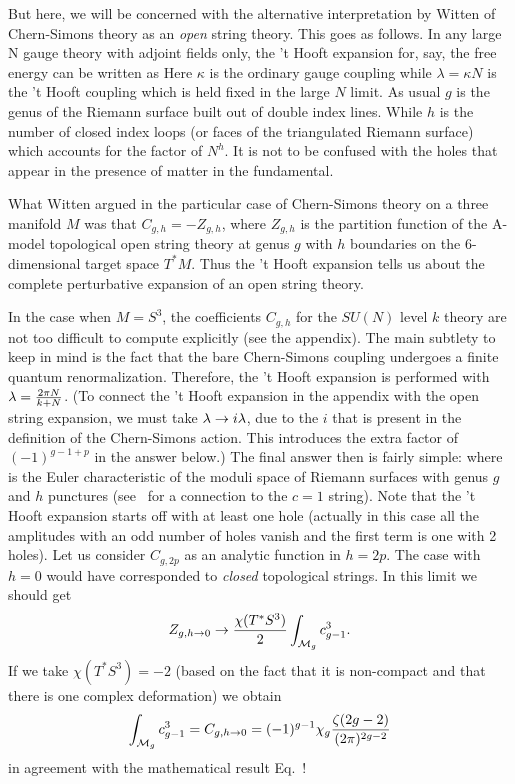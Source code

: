 But here, we will be concerned with the alternative interpretation
by Witten of Chern-Simons theory as an {\it open} string theory. This goes
as follows. In any large N gauge theory with adjoint fields only, the
't Hooft expansion for, say, the free energy can be written as
%
\eqn{}
%
Here $\kappa$ is the ordinary gauge coupling while $\lambda=\kappa N$ is the
't Hooft coupling which is held fixed in the large $N$ limit. As usual $g$ is
the
genus of the Riemann surface built out of double index lines. While $h$ is
the number of closed index loops (or faces of the triangulated Riemann
surface) which accounts for the factor of $N^h$. It is not to be confused
with the holes that appear in the presence of matter in the fundamental.

What Witten argued in the particular case of Chern-Simons theory on a
three manifold $M$ was that $C_{g,h}=-Z_{g,h}$, where $Z_{g,h}$ is
the partition function of the
A-model topological  open string theory at genus $g$ with $h$ boundaries
on the 6-dimensional target space $T^*M$.
Thus the 't Hooft expansion tells us about the
complete perturbative expansion of an open string theory.

In the case when $M=S^3$, the coefficients $C_{g,h}$ for the $SU(N)$ level
$k$
theory are not too difficult
to compute explicitly (see the appendix). The main subtlety to keep in mind
is the fact that
the bare Chern-Simons coupling undergoes a finite quantum renormalization.
Therefore, the 't Hooft expansion is performed with $\lambda={2\pi N\over
k+N}$.
(To connect the 't Hooft expansion in the appendix with the open string
expansion,
we must take $\lambda \rightarrow i\lambda$, due to the $i$ that is present in the
definition of the Chern-Simons action. This introduces the extra factor of
$(-1)^{g-1+p}$ in the answer below.)
The final answer then is fairly simple:
%
\eqn{}
%
where
%
\eqn{}
%
is the Euler characteristic of the moduli space of Riemann surfaces with
genus $g$ and $h$ punctures (see \dv\ for a connection to the $c=1$ string).
Note that the
't Hooft expansion starts off with at least one hole (actually
in this case all the amplitudes with an odd number of holes vanish
and the first term is one with 2 holes).  Let us consider
$C_{g,2p}$ as an analytic function in $h=2p$.  The case
with $h=0$ would have corresponded to {\it closed} topological
strings.  In this limit we should get
%
$$Z_{g,h\rightarrow 0} \rightarrow  {\chi(T^* S^3)\over 2}\int_{{\cal M}_g}
c_{g-1}^3.$$
%
If we take $\chi(T^* S^3)=-2$ (based on the fact that it is non-compact
and that there is one complex deformation) we obtain
%
$$\int_{{\cal M}_g} c_{g-1}^3=C_{g,h\rightarrow 0}=(-1)^{g-1}\chi_g
{\zeta (2g-2)\over (2\pi)^{2g-2}}$$
%
in agreement with the mathematical result Eq.\cgeqn\ !

